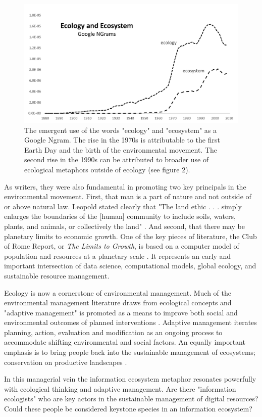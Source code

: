  \begin{figure}[!ht]
  \centering
    \includegraphics[width=5.5in]{figures/ecologyEcosystem}
  \caption{The emergent use of the words "ecology" and "ecosystem" as a Google Ngram. The rise in the 1970s is attributable to the first Earth Day and the birth of the environmental movement. The second rise in the 1990s can be attributed to broader use of ecological metaphors outside of ecology (see figure 2).}
\end{figure}
 
As writers, they were also fundamental in promoting two key principals in the environmental movement. First, that man is a part of nature and not outside of or above natural law. Leopold stated clearly that "The land ethic . . . simply enlarges the boundaries of the [human] community to include soils, waters, plants, and animals, or collectively the land" \citep[][p. 204]{leopold_1949}. And second, that there may be planetary limits to economic growth. One of the key pieces of literature, the Club of Rome Report, or \textit{The Limits to Growth}, is based on a computer model of population and resources at a planetary scale \citep{meadows_1972}. It represents an early and important intersection of data science, computational models, global ecology, and sustainable resource management.
 
Ecology is now a cornerstone of environmental management. Much of the environmental management literature draws from ecological concepts and "adaptive management" is promoted as a means to improve both social and environmental outcomes of planned interventions \citep{holling_1978,leopold_1963}. Adaptive management iterates planning, action, evaluation and modification as an ongoing process to accommodate shifting environmental and social factors. An equally important emphasis is to bring people back into the sustainable management of ecosystems; conservation on productive landscapes \citep{berkes_2000,holling_2002}. 

In this managerial vein the information ecosystem metaphor resonates powerfully with ecological thinking and adaptive management. Are there "information ecologists" who are key actors in the sustainable management of digital resources? Could these people be considered keystone species in an information ecosystem?
